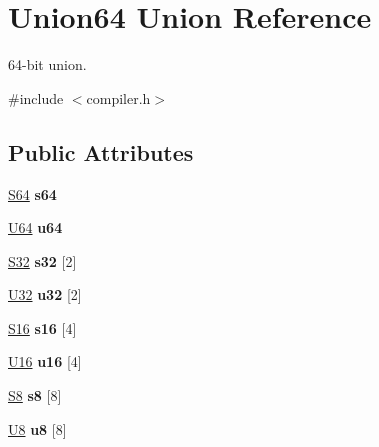 \hypertarget{union_union64}{\section{Union64 Union Reference}
\label{union_union64}
}


64-\/bit union.  




{\ttfamily \#include $<$compiler.\-h$>$}

\subsection*{Public Attributes}
\begin{DoxyCompactItemize}
\item 
\hypertarget{union_union64_a0d2ab3a488d93c2beed7987ef70e5628}{\hyperlink{group__group__xmega__utils_ga1d293e5c494dd6826239b02f5fe98e7f}{S64} {\bfseries s64}}\label{union_union64_a0d2ab3a488d93c2beed7987ef70e5628}

\item 
\hypertarget{union_union64_aac95b1d1211f52003bbc09498393ee0d}{\hyperlink{group__group__xmega__utils_ga25809e0734a149248fcf5831efa4e33d}{U64} {\bfseries u64}}\label{union_union64_aac95b1d1211f52003bbc09498393ee0d}

\item 
\hypertarget{union_union64_ae890c7ae7f04f6c98b8b993798b4b786}{\hyperlink{group__group__xmega__utils_ga39c786017723555afb9e8b85accec0de}{S32} {\bfseries s32} \mbox{[}2\mbox{]}}\label{union_union64_ae890c7ae7f04f6c98b8b993798b4b786}

\item 
\hypertarget{union_union64_a416b86ab0cf38421987d45bee1000702}{\hyperlink{group__group__xmega__utils_ga696390429f2f3b644bde8d0322a24124}{U32} {\bfseries u32} \mbox{[}2\mbox{]}}\label{union_union64_a416b86ab0cf38421987d45bee1000702}

\item 
\hypertarget{union_union64_a56c977487240706b5fa1aeb4012711cd}{\hyperlink{group__group__xmega__utils_ga6d241ad21a823c90d4835380787db5d4}{S16} {\bfseries s16} \mbox{[}4\mbox{]}}\label{union_union64_a56c977487240706b5fa1aeb4012711cd}

\item 
\hypertarget{union_union64_a84d17166beaeb6ae79afa3909fc7955b}{\hyperlink{group__group__xmega__utils_ga0a0a322d5fa4a546d293a77ba8b4a71f}{U16} {\bfseries u16} \mbox{[}4\mbox{]}}\label{union_union64_a84d17166beaeb6ae79afa3909fc7955b}

\item 
\hypertarget{union_union64_a2e9bbd7e091680a8203e1239d62fd3b0}{\hyperlink{group__group__xmega__utils_gaf1475a0bb1962ef08dd1f78bd5dba87a}{S8} {\bfseries s8} \mbox{[}8\mbox{]}}\label{union_union64_a2e9bbd7e091680a8203e1239d62fd3b0}

\item 
\hypertarget{union_union64_af6c6dafc0f068fe37b06e2f4c73184c4}{\hyperlink{group__group__xmega__utils_gaa63ef7b996d5487ce35a5a66601f3e73}{U8} {\bfseries u8} \mbox{[}8\mbox{]}}\label{union_union64_af6c6dafc0f068fe37b06e2f4c73184c4}

\end{DoxyCompactItemize}


